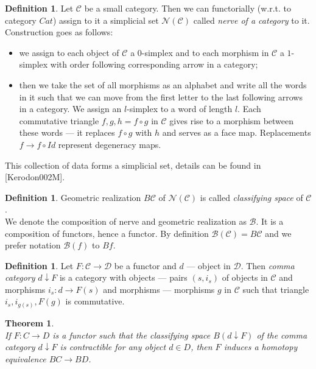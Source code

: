 \documentclass[english,12pt]{article}
\newcounter{stmcounter}[section]
\newcounter{thcounter}
\numberwithin{equation}{section}
\newtheorem{theorem}[thcounter]{Theorem}
\theoremstyle{definition}
\newtheorem{definition}[stmcounter]{Definition}
\theoremstyle{remark}
\newcommand{\define}[1]{{\textit{#1}}}
\begin{document}
\begin{definition}
  Let $\mathcal{C}$ be a small category. Then we can functorially (w.r.t. to category $Cat$) assign to it a simplicial set $\mathcal{N}(\mathcal{C})$ called \define{nerve of a category} to it.\\

  Construction goes as follows:
  \begin{itemize}
    \item we assign to each object of $\mathcal{C}$ a $0$-simplex and to each morphism in $\mathcal{C}$ a $1$-simplex with order following corresponding arrow in a category;
    \item then we take the set of all morphisms as an alphabet and write all the words in it such that we can move from the first letter to the last following arrows in a category. We assign an $l$-simplex to a word of length $l$. Each commutative triangle $f, g, h = f \circ g$ in $\mathcal{C}$ gives rise to a morphism between these words --- it replaces $f \circ g$ with $h$ and serves as a face map. Replacements $f \to f \circ Id$ represent degeneracy maps.
  \end{itemize}

  This collection of data forms a simplicial set, details can be found in [Kerodon002M].
\end{definition}

\begin{definition}
  Geometric realization $B\mathcal{C}$ of $\mathcal{N}(\mathcal{C})$ is called \define{classifying space} of $\mathcal{C}$.\\

  We denote the composition of nerve and geometric realization as $\mathcal{B}$. It is a composition of functors, hence a functor. By definition $\mathcal{B}(\mathcal{C}) = B\mathcal{C}$ and we prefer notation $\mathcal{B}(f)$ to $Bf$.
\end{definition}

\begin{definition}
  Let $F: \mathcal{C} \to \mathcal{D}$ be a functor and $d$ --- object in $\mathcal{D}$. Then \define{comma category} $d \downarrow F$ is a category with objects --- pairs $(s,i_s)$ of objects in $\mathcal{C}$ and morphisms $i_s : d \to F(s)$ and morphisms --- morphisms $g$ in $\mathcal{C}$ such that triangle $i_s, i_{g(s)}, F(g)$ is commutative.
\end{definition}

\begin{theorem} {\cite[Theorem A]{Quillen72}}\\
  If $F: C \to D$ is a functor such that the classifying space $B(d \downarrow F)$ of the comma category $d \downarrow F$ is contractible for any object $d \in D$, then $F$ induces a homotopy equivalence $BC \to BD$.
\end{theorem}
\end{document}
